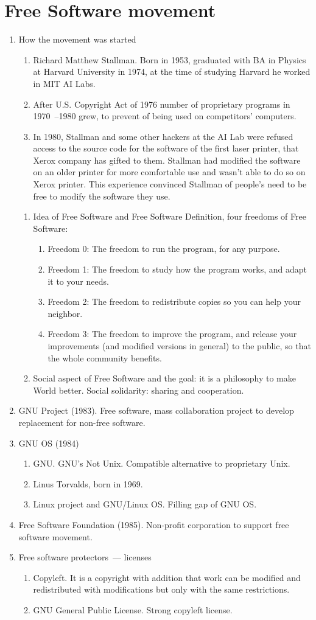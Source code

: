 \documentclass[10pt,a4paper]{article}
\newcommand{\bee}{\begin{enumerate}}
\newcommand{\ene}{\end{enumerate}}
\begin{document}
\section{Free Software movement}
\bee
  \item How the movement was started
  \bee
    \item Richard Matthew Stallman. Born in 1953, graduated with BA in Physics at Harvard University in 1974, 
    at the time of studying Harvard he worked in MIT AI Labs.
    \item After U.S. Copyright Act of 1976 number of proprietary programs in 1970~--1980 grew, 
    to prevent of being used on competitors' computers.
    \item In 1980, Stallman and some other hackers at the AI Lab were refused access to the source code for the software 
    of the first laser printer, that Xerox company has gifted to them. 
    Stallman had modified the software on an older printer for more comfortable use and wasn't able to do so on Xerox printer.
    This experience convinced Stallman of people's need to be free to modify the software they use.
  \ene
  \bee
    \item Idea of Free Software and Free Software Definition, four freedoms of Free Software:
    \bee
      \item[Freedom 0:] The freedom to run the program, for any purpose.
      \item[Freedom 1:] The freedom to study how the program works, and adapt it to your needs.
      \item[Freedom 2:] The freedom to redistribute copies so you can help your neighbor.
      \item[Freedom 3:] The freedom to improve the program, and release your improvements 
      (and modified versions in general) to the public, so that the whole community benefits.
    \ene
    \item Social aspect of Free Software and the goal: it is a philosophy to make World better.
    Social solidarity: sharing and cooperation.
  \ene
  \item GNU Project (1983). Free software, mass collaboration project to develop replacement for non-free software.
  \item GNU OS (1984)
  \bee
    \item GNU. GNU's Not Unix. Compatible alternative to proprietary Unix.
    \item Linus Torvalds, born in 1969.
    \item Linux project and GNU/Linux OS. Filling gap of GNU OS.
  \ene
  \item Free Software Foundation (1985). Non-profit corporation to support free software movement.
  \item Free software protectors~--- licenses
  \bee
    \item Copyleft. 
    It is a copyright with addition that work can be modified and redistributed with modifications 
    but only with the same restrictions.
    \item GNU General Public License. Strong copyleft license.
  \ene
\ene
\end{document}
